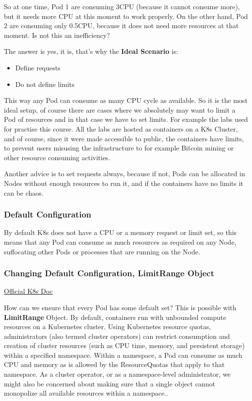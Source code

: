 \documentclass{article}
\begin{document}
So at one time, Pod 1 are consuming 3CPU (because it cannot consume more), but it needs more CPU at this moment to work properly. On the other hand, Pod 2 are consuming only 0.5CPU, because it does not need more resources at that moment. Is not this an inefficiency?

The answer is yes, it is, that's why the \textbf{Ideal Scenario} is:
\begin{itemize}
    \item Define requests
    \item Do not define limits
\end{itemize}

This way any Pod can consume as many CPU cycle as available. So it is the most ideal setup, of course there are cases where we absolutely may want to limit a Pod of resources and in that case we have to set limits. For example the labs used for practise this course. All the labs are hosted as containers on a K8s Cluster, and of course, since it were made accessible to public, the containers have limits, to prevent users misusing the infrastructure to for example Bitcoin mining or other resource consuming activities.

Another advice is to set requests always, because if not, Pods can be allocated in Nodes without enough resources to run it, and if the containers have no limits it can be chaos.


\subsubsection{Default Configuration}

By default K8s does not have a CPU or a memory request or limit set, so this means that any Pod can consume as much resources as required on any Node, suffocating other Pods or processes that are running on the Node.

\subsubsection{Changing Default Configuration, LimitRange Object}

\href{https://kubernetes.io/docs/concepts/policy/limit-range/}{Official K8s Doc}

How can we ensure that every Pod has some default set? This is possible with \textbf{LimitRange} Object. By default, containers run with unbounded compute resources on a Kubernetes cluster. Using Kubernetes resource quotas, administrators (also termed cluster operators) can restrict consumption and creation of cluster resources (such as CPU time, memory, and persistent storage) within a specified namespace. Within a namespace, a Pod can consume as much CPU and memory as is allowed by the ResourceQuotas that apply to that namespace. As a cluster operator, or as a namespace-level administrator, we might also be concerned about making sure that a single object cannot monopolize all available resources within a namespace..
\end{document}
